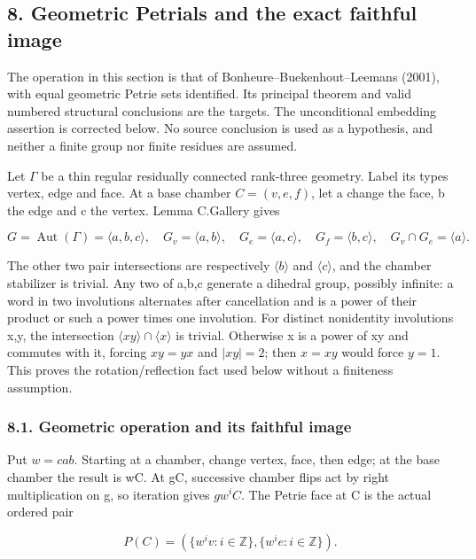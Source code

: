\documentclass[
  11pt,
  a4paper,
]{article}
\begin{document}
\subsection{8. Geometric Petrials and the exact faithful
image}\label{geometric-petrials-and-the-exact-faithful-image}

The operation in this section is that of Bonheure--Buekenhout--Leemans
(2001), with equal geometric Petrie sets identified. Its principal
theorem and valid numbered structural conclusions are the targets. The
unconditional embedding assertion is corrected below. No source
conclusion is used as a hypothesis, and neither a finite group nor
finite residues are assumed.

Let \(\Gamma\) be a thin regular residually connected rank-three
geometry. Label its types vertex, edge and face. At a base chamber
\(C=(v,e,f)\), let a change the face, b the edge and c the vertex. Lemma
C.Gallery gives

\[
 G=\operatorname{Aut}(\Gamma)=\langle a,b,c\rangle,
 \quad G_v=\langle a,b\rangle,\quad G_e=\langle a,c\rangle,
 \quad G_f=\langle b,c\rangle,\quad G_v\cap G_e=\langle a\rangle.
 \tag{P1}
\]

The other two pair intersections are respectively \(\langle b\rangle\)
and \(\langle c\rangle\), and the chamber stabilizer is trivial. Any two
of a,b,c generate a dihedral group, possibly infinite: a word in two
involutions alternates after cancellation and is a power of their
product or such a power times one involution. For distinct nonidentity
involutions x,y, the intersection
\(\langle xy\rangle \cap \langle x\rangle\) is trivial. Otherwise x is a
power of xy and commutes with it, forcing \(xy=yx\) and \(|xy|=2\); then
\(x=xy\) would force \(y=1\). This proves the rotation/reflection fact
used below without a finiteness assumption.

\subsubsection{8.1. Geometric operation and its faithful
image}\label{geometric-operation-and-its-faithful-image}

Put \(w=cab\). Starting at a chamber, change vertex, face, then edge; at
the base chamber the result is wC. At gC, successive chamber flips act
by right multiplication on g, so iteration gives \(gw^iC\). The Petrie
face at C is the actual ordered pair

\[
 P(C)=\left(\{w^iv:i\in\mathbb Z\},\{w^ie:i\in\mathbb Z\}\right).
 \tag{P2}
\]
\end{document}
